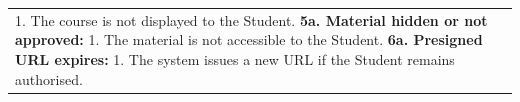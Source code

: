 \begin{longtable}{|>{\raggedright\arraybackslash}p{}|>{\raggedright\arraybackslash}p{}|}
\hspace*{1em}1. The course is not displayed to the Student. \newline
\textbf{5a. Material hidden or not approved:} \newline
\hspace*{1em}1. The material is not accessible to the Student. \newline
\textbf{6a. Presigned URL expires:} \newline
\hspace*{1em}1. The system issues a new URL if the Student remains authorised. \\
\end{longtable}



\renewcommand{\arraystretch}{1.12}
